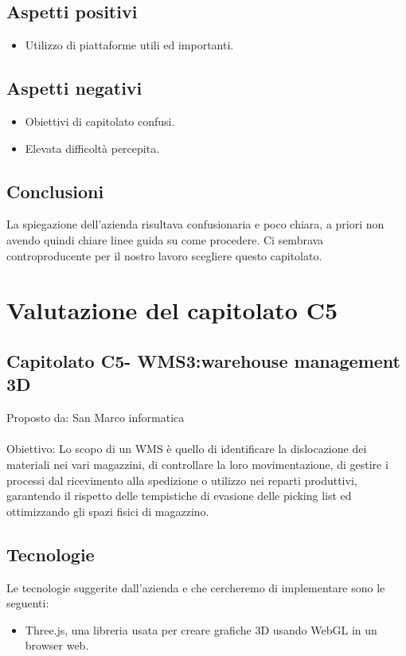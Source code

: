 \documentclass{article}
\begin{document}
\subsection{Aspetti positivi}
\begin{itemize}
    \item Utilizzo di piattaforme utili ed importanti.
\end{itemize}
\subsection{Aspetti negativi}
\begin{itemize}
    \item Obiettivi di capitolato confusi.
    \item Elevata difficoltà percepita.
\end{itemize}
\subsection{Conclusioni}
La spiegazione dell'azienda risultava confusionaria e poco chiara, a priori non avendo quindi chiare linee guida su come procedere. Ci sembrava controproducente per il nostro lavoro scegliere questo capitolato.
\section{Valutazione del capitolato C5}
\subsection{Capitolato C5- WMS3:warehouse management 3D}
Proposto da: San Marco informatica\\ \\
Obiettivo: Lo scopo di un WMS è quello di identificare la dislocazione dei materiali nei vari magazzini, di controllare la loro movimentazione, di gestire i processi dal ricevimento alla spedizione o utilizzo nei reparti produttivi, garantendo il rispetto delle tempistiche di evasione delle picking list ed ottimizzando gli spazi fisici di magazzino.
\subsection{Tecnologie}
Le tecnologie suggerite dall’azienda e che cercheremo di implementare sono le seguenti:
\begin{itemize}
    \item Three.js, una libreria usata per creare grafiche 3D usando WebGL in un browser web.
\end{itemize}
\end{document}
